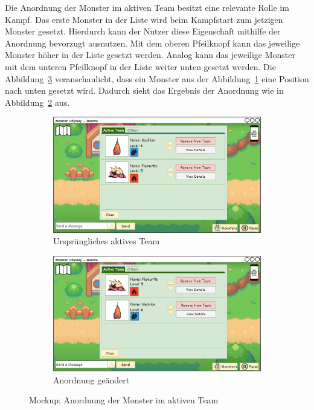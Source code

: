 Die Anordnung der Monster im aktiven Team besitzt eine relevante Rolle im Kampf. 
Das erste Monster in der Liste wird beim Kampfstart zum jetzigen Monster gesetzt. Hierdurch kann der Nutzer diese Eigenschaft mithilfe der Anordnung bevorzugt ausnutzen. 
Mit dem oberen Pfeilknopf kann das jeweilige Monster höher in der Liste gesetzt werden. Analog kann das jeweilige Monster mit dem unteren Pfeilknopf in der Liste weiter unten gesetzt werden. Die Abbildung~\ref{fig: Anordnung der Monster im aktiven Team} veranschaulicht, dass ein Monster aus der Abbildung~\ref{fig: Ursprüngliches aktives Team} eine Position nach unten gesetzt wird. Dadurch sieht das Ergebnis der Anordnung wie in Abbildung~\ref{fig: Anordnung geändert} aus.
\begin{figure}[H]
    \centering
    \begin{subfigure}[b]{0.4\textwidth}
        \includegraphics[width=\textwidth]{images/mockups/Monster/IngameMonsterMonster.png}
        \caption{Ursprüngliches aktives Team}
        \label{fig: Ursprüngliches aktives Team}
    \end{subfigure}
    \hfill
    \begin{subfigure}[b]{0.4\textwidth}
        \includegraphics[width=\textwidth]{images/mockups/Monster/IngameMonsterMoved.png}
        \caption{Anordnung geändert}
        \label{fig: Anordnung geändert}
    \end{subfigure}
    \caption{Mockup: Anordnung der Monster im aktiven Team}
    \label{fig: Anordnung der Monster im aktiven Team}
\end{figure}
